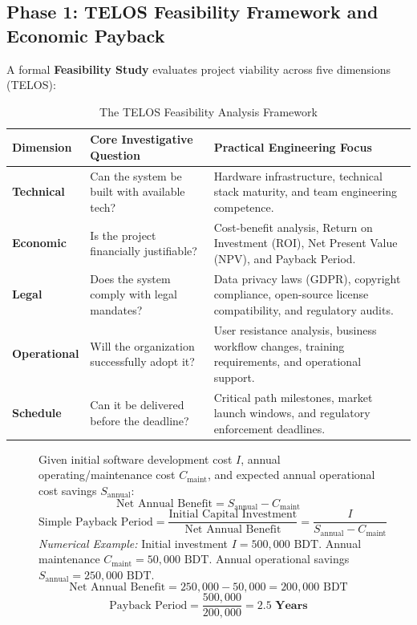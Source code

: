 \subsection{Phase 1: TELOS Feasibility Framework and Economic Payback}
A formal \textbf{Feasibility Study} evaluates project viability across five dimensions (TELOS):
\begin{table}[htbp]
\centering
\small
\caption{The TELOS Feasibility Analysis Framework}
\label{tab:telos_framework}
\begin{tabularx}{\textwidth}{l p{4.5cm} X}
\toprule
\textbf{Dimension} & \textbf{Core Investigative Question} & \textbf{Practical Engineering Focus} \\
\midrule
\textbf{Technical} & Can the system be built with available tech? & Hardware infrastructure, technical stack maturity, and team engineering competence. \\
\textbf{Economic} & Is the project financially justifiable? & Cost-benefit analysis, Return on Investment (ROI), Net Present Value (NPV), and Payback Period. \\
\textbf{Legal} & Does the system comply with legal mandates? & Data privacy laws (GDPR), copyright compliance, open-source license compatibility, and regulatory audits. \\
\textbf{Operational} & Will the organization successfully adopt it? & User resistance analysis, business workflow changes, training requirements, and operational support. \\
\textbf{Schedule} & Can it be delivered before the deadline? & Critical path milestones, market launch windows, and regulatory enforcement deadlines. \\
\bottomrule
\end{tabularx}
\end{table}

\begin{figure}[htbp]
\centering
\begin{tcolorbox}[colback=codebg, colframe=primary, title=\textbf{Economic Payback Period Formulation}]
Given initial software development cost $I$, annual operating/maintenance cost $C_{\text{maint}}$, and expected annual operational cost savings $S_{\text{annual}}$:
\begin{equation}
\text{Net Annual Benefit} = S_{\text{annual}} - C_{\text{maint}}
\end{equation}
\begin{equation}
\boxed{\text{Simple Payback Period} = \frac{\text{Initial Capital Investment}}{\text{Net Annual Benefit}} = \frac{I}{S_{\text{annual}} - C_{\text{maint}}}}
\end{equation}
\textit{Numerical Example:} Initial investment $I = 500,000\text{ BDT}$. Annual maintenance $C_{\text{maint}} = 50,000\text{ BDT}$. Annual operational savings $S_{\text{annual}} = 250,000\text{ BDT}$.
\[
\text{Net Annual Benefit} = 250,000 - 50,000 = 200,000\text{ BDT}
\]
\[
\text{Payback Period} = \frac{500,000}{200,000} = \mathbf{2.5\text{ Years}}
\]
\end{tcolorbox}
\end{figure}

